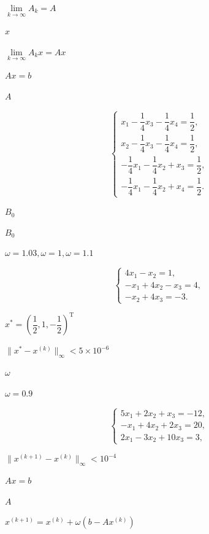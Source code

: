 \documentclass[UTF8,fontset=fandol]{ctexart}
\begin{document}
$\lim\limits_{k\to\infty}A_k=A$\par

$x$\par

$\lim\limits_{k\to\infty}A_kx=Ax$\par

$Ax=b$\par

$A$\par

\[
\begin{cases}
x_1-\dfrac14x_3-\dfrac14x_4=\dfrac12,\\[5pt]
x_2-\dfrac14x_3-\dfrac14x_4=\dfrac12,\\[5pt]
-\dfrac14x_1-\dfrac14x_2+x_3=\dfrac12,\\[5pt]
-\dfrac14x_1-\dfrac14x_2+x_4=\dfrac12.
\end{cases}
\]

$B_0$\par

$B_0$\par

$\omega=1.03,\omega=1,\omega=1.1$\par

\[
\begin{cases}
4x_1-x_2=1,\\
-x_1+4x_2-x_3=4,\\
-x_2+4x_3=-3.
\end{cases}
\]

$x^*=\left(\dfrac12,1,-\dfrac12\right)^{\mathrm T}$\par

$\|x^*-x^{(k)}\|_\infty<5\times10^{-6}$\par

$\omega$\par

$\omega=0.9$\par

\[
\begin{cases}
5x_1+2x_2+x_3=-12,\\
-x_1+4x_2+2x_3=20,\\
2x_1-3x_2+10x_3=3,
\end{cases}
\]

$\|x^{(k+1)}-x^{(k)}\|_\infty<10^{-4}$\par

$Ax=b$\par

$A$\par

$x^{(k+1)}=x^{(k)}+\omega(b-Ax^{(k)})$\par
\end{document}
